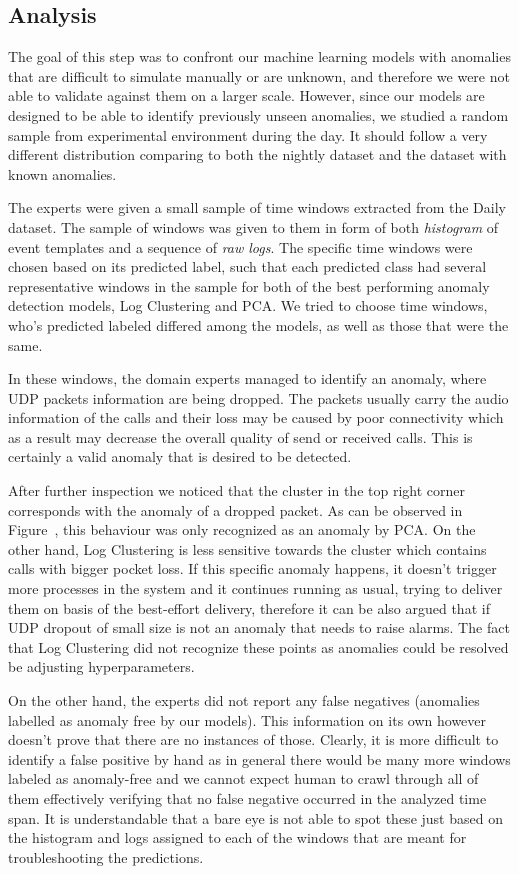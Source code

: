 \subsection{Analysis}
The goal of this step was to confront our machine learning models with anomalies that are difficult to simulate manually or are unknown, and therefore we were not able to validate against them on a larger scale. However, since our models are designed to be able to identify previously unseen anomalies, we studied a random sample from experimental environment during the day. It should follow a very different distribution comparing to both the nightly dataset and the dataset with known anomalies.

The experts were given a small sample of time windows extracted from the Daily dataset. The sample of  windows was given to them in form of both \textit{histogram} of event templates and a sequence of \textit{raw logs}. The specific time windows were chosen based on its predicted label, such that each predicted class had several representative windows in the sample for both of the best performing anomaly detection models, Log Clustering and PCA. We tried to choose time windows, who's predicted labeled differed among the models, as well as those that were the same.

In these windows, the domain experts managed to identify an anomaly, where UDP packets information are being dropped. The packets usually carry the audio information of the calls and their loss may be caused by poor connectivity which as a result may decrease the overall quality of send or received calls.  This is certainly a valid anomaly that is desired to be detected. 

After further inspection we noticed that the cluster in the top right corner corresponds with the anomaly of a dropped packet. As can be observed in Figure~\label{fig:tsne-unslabeled-plots}, this behaviour was only recognized as an anomaly by PCA. On the other hand, Log Clustering is less sensitive towards the cluster which contains calls with bigger pocket loss. If this specific anomaly happens, it doesn't trigger more processes in the system and it continues running as usual, trying to deliver them on basis of the best-effort delivery, therefore it can be also argued that if UDP dropout of small size is not an anomaly that needs to raise alarms. The fact that Log Clustering did not recognize these points as anomalies could be resolved be adjusting hyperparameters.

On the other hand, the experts did not report any false negatives (anomalies labelled as anomaly free by our models). This information on its own however doesn't prove that there are no instances of those.
Clearly, it is more difficult to identify a false positive by hand as in general there would be many more windows labeled as anomaly-free and we cannot expect human to crawl through all of them effectively verifying that no false negative occurred in the analyzed time span. It is understandable that a bare eye is not able to spot these just based on the histogram and logs assigned to each of the windows that are meant for troubleshooting the predictions.